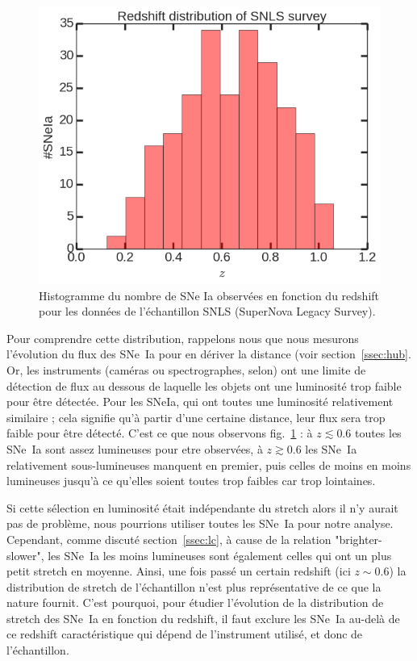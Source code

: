 \documentclass[a4paper, 12pt, svgnames]{article}
\begin{document}
\begin{figure}[htbp!]
    \centering
    \includegraphics[width=.5\linewidth]{Rapport_figures/redshift_miss.png}
    \captionsetup{justification=centering}
    \caption{Histogramme du nombre de SNe Ia observées en fonction du redshift
    pour les données de l'échantillon SNLS (SuperNova Legacy Survey).}
    \label{fig:redshift_miss}
\end{figure}

Pour comprendre cette distribution, rappelons nous que nous mesurons l'évolution
du flux des SNe~Ia pour en dériver la distance (voir section~\ref{ssec:hub}. Or,
les instruments (caméras ou spectrographes, selon) ont une limite de détection
de flux au dessous de laquelle les objets ont une luminosité trop faible pour
être détectée. Pour les SNeIa, qui ont toutes une luminosité relativement
similaire ; cela signifie qu'à partir d'une certaine distance, leur flux sera
trop faible pour être détecté. C'est ce que nous observons
fig.~\ref{fig:redshift_miss} : à $z\lesssim0.6$ toutes les SNe~Ia sont assez
lumineuses pour etre observées, à $z\gtrsim 0.6$ les SNe~Ia relativement
sous-lumineuses manquent en premier, puis celles de moins en moins lumineuses
jusqu'à ce qu'elles soient toutes trop faibles car trop lointaines.

Si cette sélection en luminosité était indépendante du stretch alors il n'y
aurait pas de problème, nous pourrions utiliser toutes les SNe~Ia pour notre
analyse. Cependant, comme discuté section~\ref{ssec:lc}, à cause de la relation
"brighter-slower", les SNe~Ia les moins lumineuses sont également celles qui ont
un plus petit stretch en moyenne. Ainsi, une fois passé un certain redshift (ici
$z\sim0.6$) la distribution de stretch de l'échantillon n'est plus
représentative de ce que la nature fournit. C'est pourquoi, pour étudier
l'évolution de la distribution de stretch des SNe~Ia en fonction du redshift, il
faut exclure les SNe~Ia au-delà de ce redshift caractéristique qui dépend de
l'instrument utilisé, et donc de l'échantillon.
\end{document}
